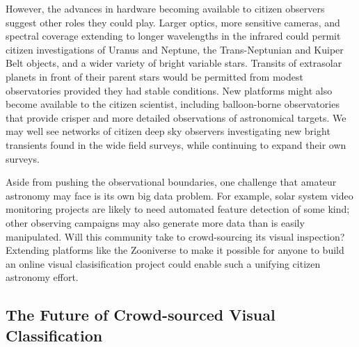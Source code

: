 \documentclass{ar2e}
\begin{document}
However, the advances in hardware becoming available to citizen observers
suggest other roles they could play. Larger optics, more sensitive cameras, and
spectral coverage extending to longer wavelengths in the infrared could permit
citizen investigations of Uranus and Neptune, the Trans-Neptunian and Kuiper
Belt objects, and a wider variety of bright variable stars.  Transits of
extrasolar planets in front of their parent stars would be permitted from modest
observatories provided they had stable conditions.  New platforms might also
become available to the citizen scientist, including balloon-borne observatories
that provide crisper and more detailed observations of astronomical targets. We
may well see networks of citizen deep sky observers investigating new bright
transients found in the wide field surveys,  while continuing to expand their
own surveys.

Aside from pushing the observational boundaries, one challenge that amateur
astronomy may face is its own big data problem.   For example, solar system
video monitoring projects are likely to need automated feature detection of some
kind; other observing campaigns may also generate more data than is easily
manipulated. Will this community take to crowd-sourcing its visual inspection?
Extending platforms like the Zooniverse to make it possible for anyone to build
an online visual clasisification project could enable such a unifying citizen
astronomy effort.





% 

\subsection{The Future of Crowd-sourced Visual Classification}
\end{document}
